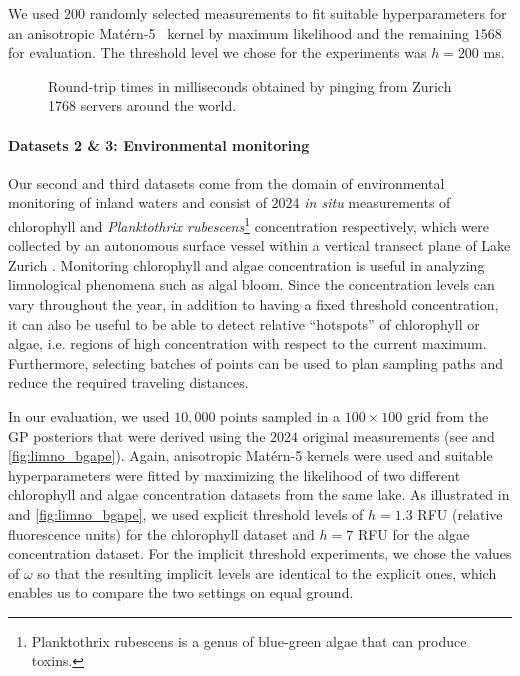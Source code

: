 We used $200$ randomly selected measurements to fit suitable hyperparameters for
an anisotropic Mat\'{e}rn-5~\mbox{\cite{rasmussen06}} kernel by maximum
likelihood  and the remaining $1568$ for evaluation.
The threshold level we chose for the experiments was $h = 200$ ms.

%
\begin{figure}[tb]
  \centering
  \caption{Round-trip times in milliseconds obtained by pinging from Zurich
           1768 servers around the world.}
  \label{fig:map}
\end{figure}

\paragraph{Datasets 2 \& 3: Environmental monitoring}
Our second and third datasets come from the domain of environmental monitoring
of inland
waters and consist of $2024$ \emph{in situ} measurements of chlorophyll
and \emph{Planktothrix rubescens}\footnote{Planktothrix rubescens is a genus of
blue-green algae that can produce toxins.}
concentration respectively, which were collected by an autonomous surface
vessel within a vertical transect plane of Lake Zurich \cite{hitz12}.
Monitoring chlorophyll and algae concentration is useful in analyzing
limnological phenomena such as algal bloom. Since the concentration levels can
vary throughout the year, in addition to having a fixed threshold
concentration, it can also be useful to be able to detect
relative ``hotspots'' of chlorophyll or algae, i.e. regions of high
concentration with respect to the current maximum. Furthermore, selecting
batches of points can be used to plan sampling paths and reduce the required
traveling distances.

In our evaluation, we used $10,000$ points sampled in a $100 \times 100$ grid
from the GP posteriors that were derived using the $2024$ original measurements
(see  and \ref{fig:limno_bgape}).
Again, anisotropic Mat\'{e}rn-5 kernels were used and suitable
hyperparameters were fitted by maximizing the
likelihood of two different chlorophyll and algae concentration datasets from
the same lake.
As illustrated in  and \ref{fig:limno_bgape}, we used
explicit threshold levels of $h = 1.3$ RFU (relative fluorescence units) for the
chlorophyll dataset and
$h = 7$ RFU for the algae concentration dataset. For the implicit threshold
experiments, we chose the values of $\omega$ so that the resulting implicit
levels are identical to the explicit ones, which enables us to compare the two
settings on equal ground.

